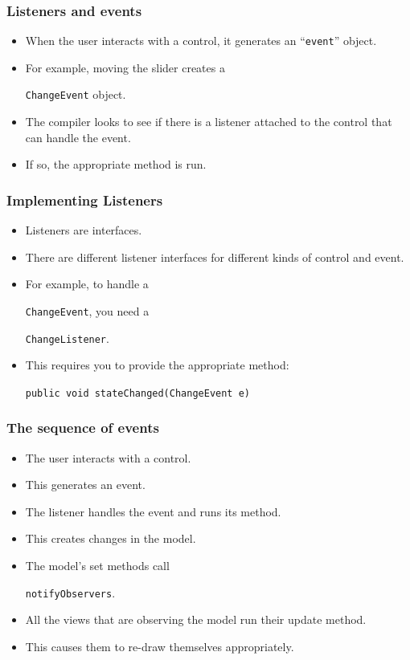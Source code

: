 \documentclass{beamer}
\def\mcolor#1#2{\rule{0ex}{0ex}\color{#1}#2\color{black}{}}
\begin{document}
\begin{frame}
  \frametitle{Listeners and events}
\begin{itemize}
\item When the user interacts with a control, it generates an
  ``\texttt{event}'' object.
\item For example, moving the slider creates a \mcolor{blue}{\texttt{ChangeEvent}}
  object.
\item The compiler looks to see if there is a listener attached to the
  control that can handle the event.
\item If so, the appropriate method is run. 
\end{itemize}
\end{frame}

\begin{frame}
\frametitle{Implementing Listeners}
\begin{itemize}
\item Listeners are interfaces.
\item There are different listener interfaces for different kinds of
  control and event.
\item For example, to handle a \mcolor{blue}{\texttt{ChangeEvent}}, you need a \mcolor{blue}{\texttt{ChangeListener}}.
\item This requires you to provide the appropriate method:\\
\mcolor{blue}{\texttt{public void stateChanged(ChangeEvent e)}}
\end{itemize}
\end{frame}

\begin{frame}
\frametitle{The sequence of events}
\begin{itemize}
\item The user interacts with a control.
\item This generates an event.
\item The listener handles the event and runs its method.
\item This creates changes in the model.
\item The model's set methods call \mcolor{blue}{\texttt{notifyObservers}}.
\item All the views that are observing the model run their update
  method.
\item This causes them to re-draw themselves appropriately.  
\end{itemize}
\end{frame}
\end{document}
